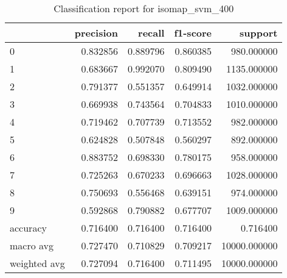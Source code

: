 \begin{table}[htb!]
\centering
\caption{Classification report for isomap_svm_400}
\label{tab:classification-report-isomap_svm_400}
\begin{tabular}{lrrrr}
\toprule
 & precision & recall & f1-score & support \\
\midrule
0 & 0.832856 & 0.889796 & 0.860385 & 980.000000 \\
1 & 0.683667 & 0.992070 & 0.809490 & 1135.000000 \\
2 & 0.791377 & 0.551357 & 0.649914 & 1032.000000 \\
3 & 0.669938 & 0.743564 & 0.704833 & 1010.000000 \\
4 & 0.719462 & 0.707739 & 0.713552 & 982.000000 \\
5 & 0.624828 & 0.507848 & 0.560297 & 892.000000 \\
6 & 0.883752 & 0.698330 & 0.780175 & 958.000000 \\
7 & 0.725263 & 0.670233 & 0.696663 & 1028.000000 \\
8 & 0.750693 & 0.556468 & 0.639151 & 974.000000 \\
9 & 0.592868 & 0.790882 & 0.677707 & 1009.000000 \\
accuracy & 0.716400 & 0.716400 & 0.716400 & 0.716400 \\
macro avg & 0.727470 & 0.710829 & 0.709217 & 10000.000000 \\
weighted avg & 0.727094 & 0.716400 & 0.711495 & 10000.000000 \\
\bottomrule
\end{tabular}
\end{table}
